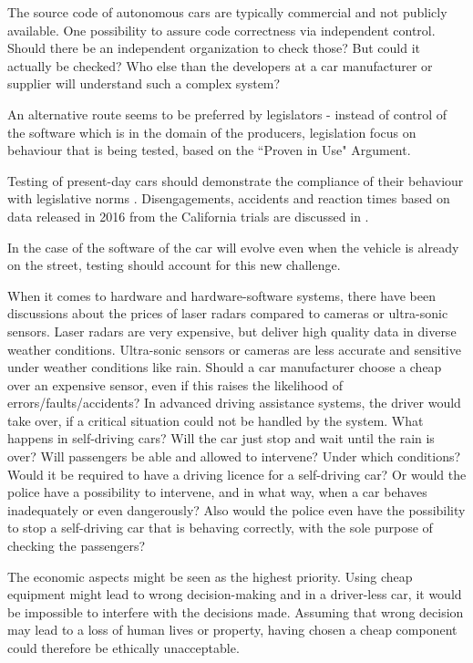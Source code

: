 The source code of autonomous cars are typically commercial and not publicly available. One possibility to assure code correctness via independent control. Should there be an independent organization to check those? But could it actually be checked? Who else than the developers at a car manufacturer or supplier will understand such a complex system? 

An alternative route seems to be preferred by legislators - instead of control of the software which is in the domain of the producers, legislation focus on behaviour that is being tested, based on the ``Proven in Use" Argument. %

Testing of present-day cars should demonstrate the compliance of their behaviour with legislative norms \cite{DepartmentofMotorVehiclesStateofCalifornia}. Disengagements, accidents and reaction times based on data released in 2016 from the California trials are discussed in \cite{10.1371/journal.pone.0168054}.

In the case of the software of the car will evolve even when the vehicle is already on the street, testing should account for this new challenge.

When it comes to hardware and hardware-software systems, there have been discussions about the prices of laser radars compared to cameras or ultra-sonic sensors. Laser radars are very expensive, but deliver high quality data in diverse weather conditions. Ultra-sonic sensors or cameras are less accurate and sensitive under weather conditions like rain. 
Should a car manufacturer choose a cheap over an expensive sensor, even if this raises the likelihood of errors/faults/accidents? In advanced driving assistance systems, the driver would take over, if a critical situation could not be handled by the system. What happens in self-driving cars? Will the car just stop and wait until the rain is over? Will passengers be able and allowed to intervene? Under which conditions? Would it be required to have a driving licence for a self-driving car? Or would the police have a possibility to intervene, and in what way, when a car behaves inadequately or even dangerously? Also would the police even have the possibility to stop a self-driving car that is behaving correctly, with the sole purpose of checking the passengers?

The economic aspects might be seen as the highest priority. Using cheap equipment might lead to wrong decision-making and in a driver-less car, it would be impossible to interfere with the decisions made. Assuming that wrong decision may lead to a loss of human lives or property, having chosen a cheap component could therefore be ethically unacceptable.

